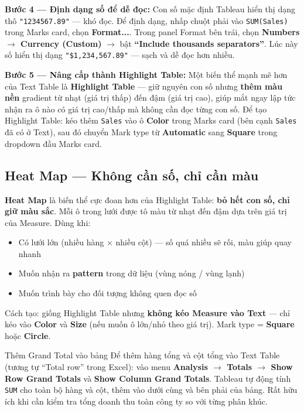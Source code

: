 \documentclass[12pt]{article}
\begin{document}
\noindent \textbf{Bước 4 --- Định dạng số để dễ đọc:} Con số mặc định Tableau hiển thị dạng thô \texttt{"1234567.89"} --- khó đọc. Để định dạng, nhấp chuột phải vào \texttt{SUM(Sales)} trong Marks card, chọn \textbf{Format...}. Trong panel Format bên trái, chọn \textbf{Numbers $\rightarrow$ Currency (Custom)} $\rightarrow$ bật \textbf{``Include thousands separators''}. Lúc này số hiển thị dạng \texttt{"\$1,234,567.89"} --- sạch và dễ đọc hơn nhiều.

\noindent \textbf{Bước 5 --- Nâng cấp thành Highlight Table:} Một biến thể mạnh mẽ hơn của Text Table là \textbf{Highlight Table} --- giữ nguyên con số nhưng \textbf{thêm màu nền} gradient từ nhạt (giá trị thấp) đến đậm (giá trị cao), giúp mắt ngay lập tức nhận ra ô nào có giá trị cao/thấp mà không cần đọc từng con số. Để tạo Highlight Table: kéo thêm \texttt{Sales} vào ô \textbf{Color} trong Marks card (bên cạnh \texttt{Sales} đã có ở Text), sau đó chuyển Mark type từ \textbf{Automatic} sang \textbf{Square} trong dropdown đầu Marks card.

\subsection{Heat Map --- Không cần số, chỉ cần màu}

\noindent \textbf{Heat Map} là biến thể cực đoan hơn của Highlight Table: \textbf{bỏ hết con số, chỉ giữ màu sắc}. Mỗi ô trong lưới được tô màu từ nhạt đến đậm dựa trên giá trị của Measure. Dùng khi:
\begin{itemize}[nosep]
    \item Có lưới lớn (nhiều hàng $\times$ nhiều cột) --- số quá nhiều sẽ rối, màu giúp quay nhanh
    \item Muốn nhận ra \textbf{pattern} trong dữ liệu (vùng nóng / vùng lạnh)
    \item Muốn trình bày cho đối tượng không quen đọc số
\end{itemize}

\noindent Cách tạo: giống Highlight Table nhưng \textbf{không kéo Measure vào Text} --- chỉ kéo vào \textbf{Color} và \textbf{Size} (nếu muốn ô lớn/nhỏ theo giá trị). Mark type = \textbf{Square} hoặc \textbf{Circle}.

\begin{tipbox}{Thêm Grand Total vào bảng}
Để thêm hàng tổng và cột tổng vào Text Table (tương tự ``Total row'' trong Excel): vào menu \textbf{Analysis $\rightarrow$ Totals $\rightarrow$ Show Row Grand Totals} và \textbf{Show Column Grand Totals}. Tableau tự động tính \texttt{SUM} cho toàn bộ hàng và cột, thêm vào dưới cùng và bên phải của bảng. Rất hữu ích khi cần kiểm tra tổng doanh thu toàn công ty so với từng phân khúc.
\end{tipbox}
\end{document}
